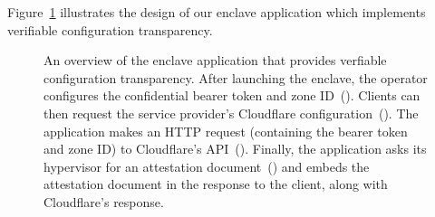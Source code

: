 Figure~\ref{fig:vct} illustrates the design of our enclave application which
implements verifiable configuration transparency.

\begin{figure}
  \centering
  
  \caption{An overview of the enclave application that provides verfiable
  configuration transparency.  After launching the enclave, the operator
  configures the confidential bearer token and zone ID~().  Clients
  can then request the service provider's Cloudflare
  configuration~().  The application makes an HTTP request (containing
  the bearer token and zone ID) to Cloudflare's API~().  Finally, the
  application asks its hypervisor for an attestation document~() and
  embeds the attestation document in the response to the client, along with
  Cloudflare's response.}%
  \label{fig:vct}
\end{figure}
